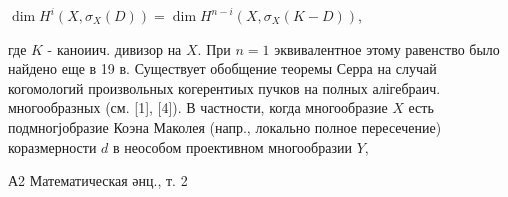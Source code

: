 \documentclass[10pt]{article}
\begin{document}
$\operatorname{dim} H^{i}\left(X, \sigma_{X}(D)\right)=\operatorname{dim} H^{n-i}\left(X, \sigma_{X}(K-D)\right)$,



где $K$ - каноиич. дивизор на $X$. При $n=1$ эквивалентное этому равенство было найдено еще в 19 в. Существует обобщение теоремы Серра на случай когомологий произвольных когерентиых пучков на полных алігебраич. многообразных (см. [1], [4]). В частности, когда многообразие $X$ есть подмногјобразие Коэна Маколея (напр., локально полное пересечение) коразмерности $d$ в неособом проективном многообразии $Y$,



А2 Математическая әнц., т. 2
\end{document}

